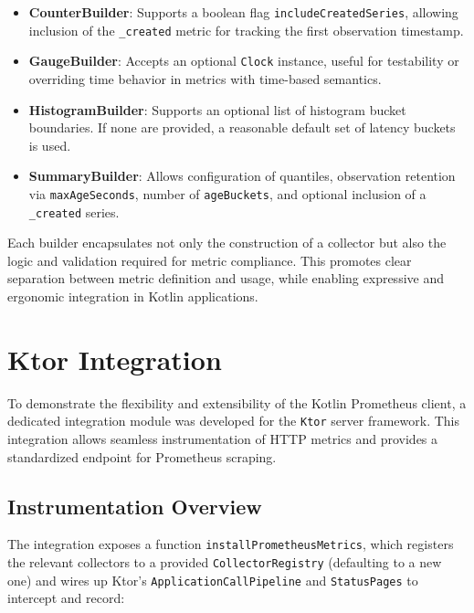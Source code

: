 \begin{itemize}
    \item \textbf{CounterBuilder}: Supports a boolean flag \texttt{includeCreatedSeries}, allowing inclusion of the \texttt{\_created} metric for tracking the first observation timestamp.

    \item \textbf{GaugeBuilder}: Accepts an optional \texttt{Clock} instance, useful for testability or overriding time behavior in metrics with time-based semantics.

    \item \textbf{HistogramBuilder}: Supports an optional list of histogram bucket boundaries. If none are provided, a reasonable default set of latency buckets is used.

    \item \textbf{SummaryBuilder}: Allows configuration of quantiles, observation retention via \texttt{maxAgeSeconds}, number of \texttt{ageBuckets}, and optional inclusion of a \texttt{\_created} series.
\end{itemize}

Each builder encapsulates not only the construction of a collector but also the logic and validation required for metric compliance. This promotes clear separation between metric definition and usage, while enabling expressive and ergonomic integration in Kotlin applications.


\section{Ktor Integration}

To demonstrate the flexibility and extensibility of the Kotlin Prometheus client, a dedicated integration module was developed for the \texttt{Ktor} server framework. This integration allows seamless instrumentation of HTTP metrics and provides a standardized endpoint for Prometheus scraping.

\subsection*{Instrumentation Overview}
The integration exposes a function \texttt{installPrometheusMetrics}, which registers the relevant collectors to a provided \texttt{CollectorRegistry} (defaulting to a new one) and wires up Ktor's \texttt{ApplicationCallPipeline} and \texttt{StatusPages} to intercept and record:

